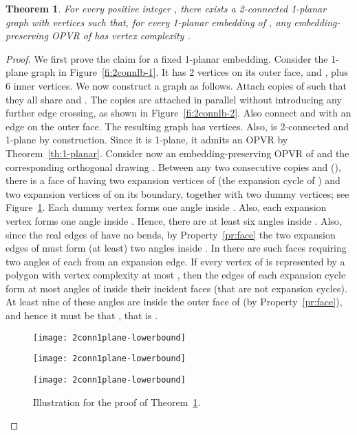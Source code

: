 \documentclass{article}
\newtheorem{theorem}{Theorem}
\newcommand{\opvr}{OPVR\xspace}
\begin{document}
\begin{theorem}\label{th:2conn-lb}
For every positive integer , there exists a 2-connected 1-planar graph  with  vertices such that, for every 1-planar embedding of , any embedding-preserving \opvr of  has vertex complexity .
\end{theorem}
\begin{proof}
We first prove the claim for a fixed 1-planar embedding. Consider the 1-plane graph  in Figure~\ref{fi:2connlb-1}. It has 2 vertices on its outer face,  and , plus 6 inner vertices. We now construct a graph  as follows. Attach  copies  of  such that they all share  and . The copies are attached in parallel without introducing any further edge crossing, as shown in Figure~\ref{fi:2connlb-2}. Also connect  and  with an edge on the outer face.  The resulting graph  has  vertices. Also,  is 2-connected and 1-plane by construction. Since it is 1-plane, it admits an \opvr by Theorem~\ref{th:1-planar}. Consider now an embedding-preserving \opvr of  and the corresponding orthogonal drawing . Between any two consecutive copies  and  (), there is a face  of  having two expansion vertices of  (the expansion cycle of ) and two expansion vertices of  on its boundary, together with two dummy vertices; see  Figure~\ref{fi:2connlb-3}. Each dummy vertex forms one  angle inside . Also, each expansion vertex forms one  angle inside . Hence, there are at least six  angles inside . Also, since the real edges of  have no bends, by Property~\ref{pr:face} the two expansion edges of  must form (at least) two  angles inside . In  there are  such faces requiring two angles of  each from an expansion edge. If every vertex of  is represented by a polygon with vertex complexity at most , then the edges of each expansion cycle form at most  angles of  inside their incident faces (that are not expansion cycles). At least nine of these angles are inside the outer face of  (by Property~\ref{pr:face}), and hence it must be that , that is . 

\begin{figure}[t]
    \centering
    \begin{minipage}[b]{.31\textwidth}
    	\centering
    	\texttt{[image: 2conn1plane-lowerbound]}
    	\subcaption{}\label{fi:2connlb-1}
    \end{minipage}
    \begin{minipage}[b]{.31\textwidth}
    	\centering
    	\texttt{[image: 2conn1plane-lowerbound]}
    	\subcaption{}\label{fi:2connlb-2}
    \end{minipage}
    \begin{minipage}[b]{.31\textwidth}
    	\centering
    	\texttt{[image: 2conn1plane-lowerbound]}
    	\subcaption{}\label{fi:2connlb-3}
    \end{minipage}
    \caption{ Illustration for the proof of Theorem~\ref{th:2conn-lb}.}
\end{figure}





\end{proof}
\end{document}
